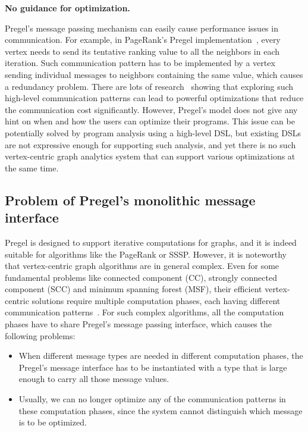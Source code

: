 \documentclass{sokendai_thesis} %
\begin{document}
\textbf{No guidance for optimization.}

Pregel's message passing mechanism can easily cause performance issues in communication.
For example, in PageRank's Pregel implementation~\cite{pregel}, every vertex needs to send its tentative ranking value to all the neighbors in each iteration.
Such communication pattern has to be implemented by a vertex sending individual messages to neighbors containing the same value, which causes a redundancy problem.
There are lots of research~\cite{xpregel,gps,distrgraphlab,yan2015effective} showing that exploring such high-level communication patterns can lead to powerful optimizations that reduce the communication cost significantly.
However, Pregel's model does not give any hint on when and how the users can optimize their programs.
This issue can be potentially solved by program analysis using a high-level DSL, but existing DSLs are not expressive enough for supporting such analysis, and yet there is no such vertex-centric graph analytics system that can support various optimizations at the same time.


\subsection{Problem of Pregel's monolithic message interface}

Pregel is designed to support iterative computations for graphs, and it is indeed suitable for algorithms like the PageRank or SSSP.
However, it is noteworthy that vertex-centric graph algorithms are in general complex.
Even for some fundamental problems like connected component (CC), strongly connected component (SCC) and minimum spanning forest (MSF), their efficient vertex-centric solutions require multiple computation phases, each having different communication patterns~\cite{yan2015effective,optimizing}.
For such complex algorithms, all the computation phases have to share Pregel's message passing interface, which causes the following problems:
\begin{itemize}
 \item When different message types are needed in different computation phases, the Pregel's message interface has to be instantiated with a type that is large enough to carry all those message values.
 \item Usually, we can no longer optimize any of the communication patterns in these computation phases, since the system cannot distinguish which message is to be optimized.
\end{itemize}
\end{document}

